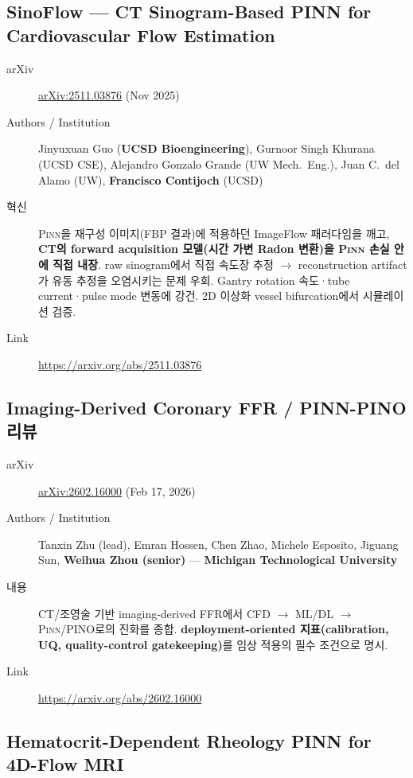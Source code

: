 \documentclass[11pt,a4paper,oneside]{report}
\newcommand{\pinn}{\textsc{Pinn}}
\newcommand{\arxivid}[1]{\href{https://arxiv.org/abs/#1}{arXiv:#1}}
\begin{document}
\subsection{SinoFlow --- CT Sinogram-Based PINN for Cardiovascular Flow Estimation}

\begin{description}
\item[arXiv] \arxivid{2511.03876} (Nov 2025)
\item[Authors / Institution] Jinyuxuan Guo (\textbf{UCSD Bioengineering}), Gurnoor Singh Khurana (UCSD CSE), Alejandro Gonzalo Grande (UW Mech.\ Eng.), Juan C.\ del Alamo (UW), \textbf{Francisco Contijoch} (UCSD)
\item[혁신] \pinn{}을 재구성 이미지(FBP 결과)에 적용하던 ImageFlow 패러다임을 깨고, \textbf{CT의 forward acquisition 모델(시간 가변 Radon 변환)을 \pinn{} 손실 안에 직접 내장}. raw sinogram에서 직접 속도장 추정 $\rightarrow$ reconstruction artifact가 유동 추정을 오염시키는 문제 우회. Gantry rotation 속도·tube current·pulse mode 변동에 강건. 2D 이상화 vessel bifurcation에서 시뮬레이션 검증.
\item[Link] \url{https://arxiv.org/abs/2511.03876}
\end{description}

\subsection{Imaging-Derived Coronary FFR / PINN-PINO 리뷰}

\begin{description}
\item[arXiv] \arxivid{2602.16000} (Feb 17, 2026)
\item[Authors / Institution] Tanxin Zhu (lead), Emran Hossen, Chen Zhao, Michele Esposito, Jiguang Sun, \textbf{Weihua Zhou (senior)} --- \textbf{Michigan Technological University}
\item[내용] CT/조영술 기반 imaging-derived FFR에서 CFD $\rightarrow$ ML/DL $\rightarrow$ \pinn{}/PINO로의 진화를 종합. \textbf{deployment-oriented 지표(calibration, UQ, quality-control gatekeeping)}를 임상 적용의 필수 조건으로 명시.
\item[Link] \url{https://arxiv.org/abs/2602.16000}
\end{description}

\subsection{Hematocrit-Dependent Rheology PINN for 4D-Flow MRI}
\end{document}
